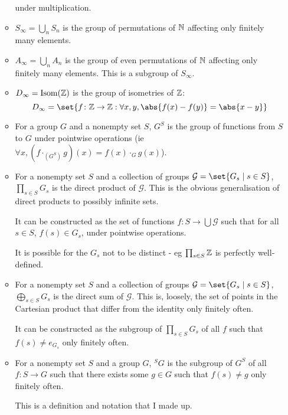 \documentclass[a4paper,12pt]{article}
\begin{document}
\begin{enumerate}[leftmargin=*]
\begin{itemize}
    under multiplication.
   \item
    \(S_\infty = \bigcup_n S_n\) is the group of permutations of \(\mathbb N\)
    affecting only finitely many elements.
   \item
    \(A_\infty = \bigcup_n A_n\) is the group of even permutations of \(\mathbb N\)
    affecting only finitely many elements. This is a subgroup of \(S_\infty\).
   \item
    \(D_\infty = \operatorname{Isom}(\mathbb Z)\) is the group of isometries of \(\mathbb Z\):
    \begin{equation*}
     D_\infty
       = \set{f\colon \Z \to \Z: \forall x, y, \abs{f(x) - f(y)} = \abs{x - y}}
    \end{equation*}
   \item
    For a group \(G\) and a nonempty set \(S\), \(G^S\) is the group of
    functions from \(S\) to \(G\) under pointwise operations
    (ie \(\forall x, (f \cdot_{(G^S)} g)(x) = f(x) \cdot_G g(x)\)).
   \item
    For a nonempty set \(S\) and a collection of groups
    \(\mathcal G = \set{G_s \mid s \in S}\), \(\prod_{s \in S} G_s\) is the
    direct product of \(\mathcal G\). This is the obvious generalisation of
    direct products to possibly infinite sets.

    It can be constructed as the set of functions
    \(f: S \to \bigcup \mathcal G\) such that for all \(s \in S\),
    \(f(s) \in G_s\), under pointwise operations.

    It is possible for the \(G_s\) not to be distinct - eg
    \(\prod_{s \in S} \mathbb Z\) is perfectly well-defined.
   \item
    For a nonempty set \(S\) and a collection of groups
    \(\mathcal G = \set{G_s \mid s \in S}\), \(\bigoplus_{s \in S} G_s\) is the
    direct sum of \(\mathcal G\). This is, loosely, the set of points in the
    Cartesian product that differ from the identity only finitely often.

    It can be constructed as the subgroup of \(\prod_{s \in S} G_s\) of all
    \(f\) such that \(f(s) \ne e_{G_s}\) only finitely often.
   \item
    For a nonempty set \(S\) and a group \(G\), \({}^SG\) is the subgroup of
    \(G^S\) of all \(f: S \to G\) such that there exists some \(g \in G\) such
    that \(f(s) \ne g\) only finitely often.

    This is a definition and notation that I made up.


\end{itemize}
\end{enumerate}
\end{document}
